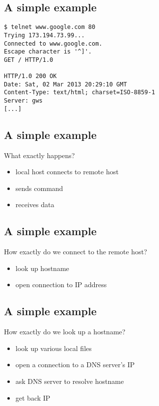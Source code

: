 \documentclass[xga]{xdvislides}
\begin{document}
\subsection{A simple example}
\Hugesize
\begin{center}
\begin{verbatim}
$ telnet www.google.com 80
Trying 173.194.73.99...
Connected to www.google.com.
Escape character is '^]'.
GET / HTTP/1.0

HTTP/1.0 200 OK
Date: Sat, 02 Mar 2013 20:29:10 GMT
Content-Type: text/html; charset=ISO-8859-1
Server: gws
[...]
\end{verbatim}
\end{center}
\Normalsize
\vspace*{\fill}


\subsection{A simple example}
What exactly happens?
\\
\begin{itemize}
	\item local host connects to remote host
	\item sends command
	\item receives data
\end{itemize}

\subsection{A simple example}
How exactly do we connect to the remote host?
\\
\begin{itemize}
	\item look up hostname
	\item open connection to IP address
\end{itemize}

\subsection{A simple example}
How exactly do we look up a hostname?
\\
\begin{itemize}
	\item look up various local files
	\item open a connection to a DNS server's IP
	\item ask DNS server to resolve hostname
	\item get back IP
\end{itemize}
\end{document}
